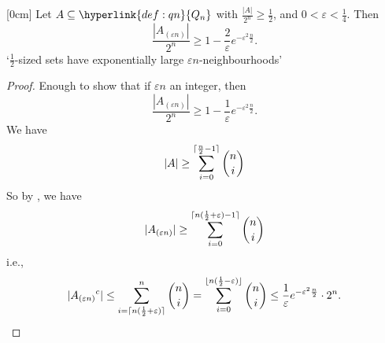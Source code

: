 \documentclass{article}
\DeclarePairedDelimiter\ceil{\lceil}{\rceil}
\DeclarePairedDelimiter\floor{\lfloor}{\rfloor}
\let\subset\subseteq
\let\epsilon\varepsilon
\begin{document}
\begin{nthm}\label{thm:2.5}
  [0cm]
  Let $A \subset \hyperlink{def:qn}{Q_n}$ with $\frac{|A|}{2^n} \geq \frac{1}{2}$, and $0 < \epsilon < \frac{1}{4}$.
  Then
  \begin{equation*}
    \frac{|A_{(\epsilon n)}|}{2^n} \geq 1 - \frac{2}{\epsilon} e^{-\epsilon^2 \frac{n}{2}}.
  \end{equation*}
  `$\frac{1}{2}$-sized sets have exponentially large $\epsilon n$-neighbourhoods'
\end{nthm}
\begin{proof}
  Enough to show that if $\epsilon n$ an integer, then
  \begin{equation*}
    \frac{|A_{(\epsilon n)}|}{2^n} \geq 1 - \frac{1}{\epsilon} e^{-\epsilon^2 \frac{n}{2}}.
  \end{equation*}
  We have
  \begin{equation*}
    |A| \geq \sum_{i=0}^{\ceil{\frac{n}{2} - 1}} \binom{n}{i}
  \end{equation*}
  So by , we have
  \begin{equation*}
    |A_{(\epsilon n)}| \geq \sum_{i=0}^{\ceil{n(\frac{1}{2} + \epsilon) - 1}} \binom{n}{i}
  \end{equation*}
  i.e.,
  \begin{equation*}
    |{A_{(\epsilon n)}}^c| \leq \sum_{i=\ceil{n (\frac{1}{2} + \epsilon)}}^n \binom{n}{i} = \sum_{i=0}^{\floor{n(\frac{1}{2}- \epsilon)}} \binom{n}{i} \leq \frac{1}{\epsilon} e^{-\epsilon^2 \frac{n}{2}} \cdot 2^n. \qedhere
  \end{equation*}
\end{proof}
\end{document}
